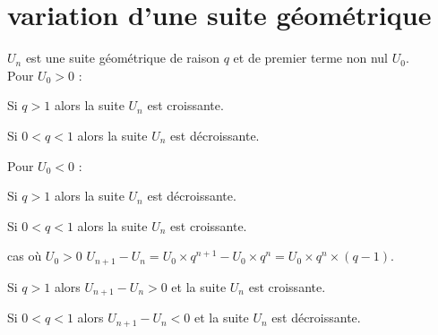 \section{variation d'une suite géométrique}

\begin{bprop}
    $U_n$ est une suite géométrique de raison $q$ et de premier terme non nul $U_0$.\\
    Pour $U_0>0$ :
    \begin{itemProp}
    	\item Si $q > 1$ alors la suite $U_n$ est croissante.
    	\item Si $0 < q < 1$ alors la suite $U_n$ est décroissante.
    \end{itemProp}
    Pour $U_0<0$ :
    \begin{itemDef}
    	\item Si $q > 1$ alors la suite $U_n$ est décroissante.
    	\item Si $0 < q < 1$ alors la suite $U_n$ est croissante.
    \end{itemDef}
\end{bprop}

\begin{bdemot}{cas où $U_0 > 0$ }
    $U_{n+1}-U_n=U_0\times q^{n+1}-U_0\times q^n=U_0\times q^n\times (q-1)$.
    \begin{itemDem}
    	\item Si $q > 1$ alors $U_{n+1}-U_n>0$ et la suite $U_n$ est croissante.
    	\item Si $0 < q < 1$ alors $U_{n+1}-U_n<0$ et la suite $U_n$ est décroissante.
    \end{itemDem}
\end{bdemot}





